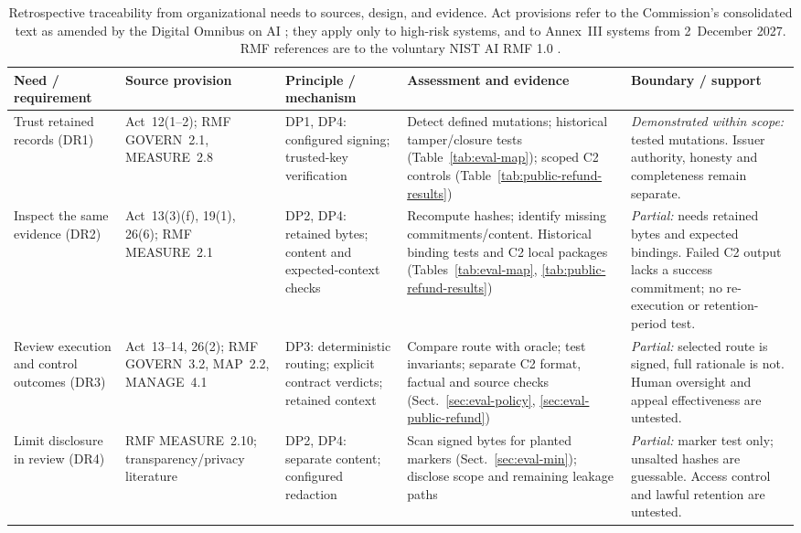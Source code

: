 \documentclass[11pt]{article}
\begin{document}
\begin{table}[!htbp]
\centering
\caption{Retrospective traceability from organizational needs to sources, design, and evidence. Act provisions refer to the Commission's consolidated text as amended by the Digital Omnibus on AI \citep{euai2026text}; they apply only to high-risk systems, and to Annex~III systems from 2~December 2027. RMF references are to the voluntary NIST AI RMF 1.0 \citep{nist2023}.}
\label{tab:governance-trace}
\footnotesize{}
\begin{tabularx}{\textwidth}{@{}>{\raggedright\arraybackslash}p{23mm}>{\raggedright\arraybackslash}p{28mm}>{\raggedright\arraybackslash}p{28mm}>{\raggedright\arraybackslash}X>{\raggedright\arraybackslash}X@{}}
\toprule
Need / requirement & Source provision & Principle / mechanism & Assessment and evidence & Boundary / support \\
\midrule
Trust retained records (DR1) & Act~12(1--2); RMF GOVERN~2.1, MEASURE~2.8 & DP1, DP4: configured signing; trusted-key verification & Detect defined mutations; historical tamper/closure tests (Table~\ref{tab:eval-map}); scoped C2 controls (Table~\ref{tab:public-refund-results}) & \emph{Demonstrated within scope:} tested mutations. Issuer authority, honesty and completeness remain separate. \\[5pt]
Inspect the same evidence (DR2) & Act~13(3)(f), 19(1), 26(6); RMF MEASURE~2.1 & DP2, DP4: retained bytes; content and expected-context checks & Recompute hashes; identify missing commitments/content. Historical binding tests and C2 local packages (Tables~\ref{tab:eval-map}, \ref{tab:public-refund-results}) & \emph{Partial:} needs retained bytes and expected bindings. Failed C2 output lacks a success commitment; no re-execution or retention-period test. \\[5pt]
Review execution and control outcomes (DR3) & Act~13--14, 26(2); RMF GOVERN~3.2, MAP~2.2, MANAGE~4.1 & DP3: deterministic routing; explicit contract verdicts; retained context & Compare route with oracle; test invariants; separate C2 format, factual and source checks (Sect.~\ref{sec:eval-policy}, \ref{sec:eval-public-refund}) & \emph{Partial:} selected route is signed, full rationale is not. Human oversight and appeal effectiveness are untested. \\[5pt]
Limit disclosure in review (DR4) & RMF MEASURE~2.10; transparency/privacy literature \citep{felzmann2019} & DP2, DP4: separate content; configured redaction & Scan signed bytes for planted markers (Sect.~\ref{sec:eval-min}); disclose scope and remaining leakage paths & \emph{Partial:} marker test only; unsalted hashes are guessable. Access control and lawful retention are untested. \\[5pt]

\end{tabularx}
\end{table}
\end{document}
